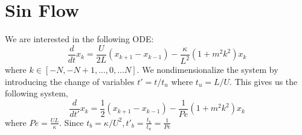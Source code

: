 






\section{Sin Flow}

We are interested in the following ODE:
%
\[
\frac{d}{dt}x_k = \frac{U}{2L}(x_{k+1}-x_{k-1}) - \frac{\kappa}{L^2}(1+m^2 k^2)x_{k}
\]
%
where $k \in [-N, -N+1 , \dots, 0, \dots N]$. We nondimensionalize the system by introducing the change of variables $t'= t/t_{u}$ where $t_{u}=L/U$. This gives us the following system,
%
\[
\frac{d}{dt'}x_k = \frac{1}{2}(x_{k+1}-x_{k-1}) - \frac{1}{Pe}(1+m^2 k^2)x_{k}
\]
%
where $Pe=\frac{UL}{\kappa}$. Since $t_{b}=\kappa/U^2, t'_{b}=\frac{t_{b}}{t_{u}} = \frac{1}{Pe} $





